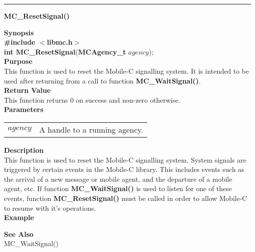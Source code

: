 \noindent
\vspace{5pt}
\rule{6.5in}{0.015in}
\noindent
{\LARGE \bf MC\_ResetSignal()}\\
{}

\noindent
{\bf Synopsis}\\
{\bf \#include $<$libmc.h$>$}\\
{\bf int MC\_ResetSignal}({\bf MCAgency\_t} $agency$);\\

\noindent
{\bf Purpose}\\
This function is used to reset the Mobile-C signalling system. 
It is intended to be used after returning from a call to function 
{\bf MC\_WaitSignal()}.\\

\noindent
{\bf Return Value}\\
This function returns 0 on success and non-zero otherwise.\\

\noindent
{\bf Parameters}
\vspace{-0.1in}
\begin{description}
\item               
\begin{tabular}{p{10 mm}p{145 mm}}
$agency$ & A handle to a running agency.
\end{tabular}
\end{description}

\noindent
{\bf Description}\\
This function is used to reset the Mobile-C signalling system. 
System signals are triggered by certain events in the Mobile-C library. 
This includes events such as the arrival of a new message or mobile agent, and 
the departure of a mobile agent, etc. 
If function {\bf MC\_WaitSignal()} is used to listen for one of these events, 
function {\bf MC\_ResetSignal()} must be called in order to allow Mobile-C to 
resume with it's operations.\\

\noindent
{\bf Example}\\
\noindent
{\footnotesize}

\noindent
{\bf See Also}\\
MC\_WaitSignal() \\

